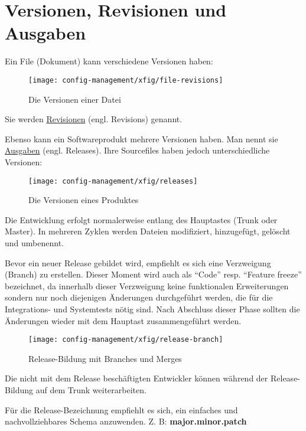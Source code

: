 \section{Versionen, Revisionen und Ausgaben}
Ein File (Dokument) kann verschiedene Versionen haben:
\begin{figure}[H]
\begin{center}
\texttt{[image: config-management/xfig/file-revisions]}
\end{center}
\caption{Die Versionen einer Datei}
\end{figure}
Sie werden \underline{Revisionen} (engl. Revisions) genannt.

\ifslides
\else
Ebenso kann ein Softwareprodukt mehrere Versionen haben. Man
nennt sie \underline{Ausgaben} (engl. Releases). Ihre Sourcefiles
haben jedoch unterschiedliche Versionen:

\fi
\begin{figure}[H]
\begin{center}
\texttt{[image: config-management/xfig/releases]}
\end{center}
\caption{Die Versionen eines Produktes}
\end{figure}
\newslide

Die Entwicklung erfolgt normalerweise entlang des Hauptastes
(Trunk oder Master). In mehreren Zyklen werden Dateien modifiziert,
hinzugefügt, gelöscht und umbenennt.

Bevor ein neuer Release gebildet wird, empfiehlt es sich
eine Verzweigung (Branch) zu erstellen. Dieser Moment wird auch als
``Code'' resp. ``Feature freeze'' bezeichnet, da innerhalb dieser Verzweigung
keine funktionalen Erweiterungen sondern nur noch diejenigen
Änderungen durchgeführt werden, die für die Integrations- und
Systemtests nötig sind. Nach Abschluss dieser Phase sollten die
Änderungen wieder mit dem Hauptast zusammengeführt werden.
\begin{figure}[H]
\begin{center}
  \texttt{[image: config-management/xfig/release-branch]}
\end{center}
\caption{Release-Bildung mit Branches und Merges}
\end{figure}
Die nicht mit dem Release beschäftigten Entwickler können während der
Release-Bildung auf dem Trunk weiterarbeiten.

\newslide
Für die Release-Bezeichnung empfiehlt es sich, ein einfaches und
nachvollziehbares Schema
anzuwenden. Z. B: {\bfseries major.minor.patch}

